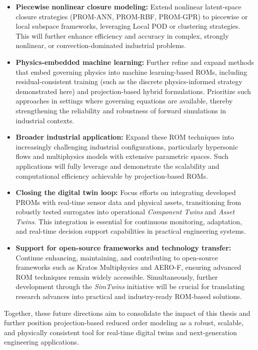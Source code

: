 \begin{itemize}
    \item \textbf{Piecewise nonlinear closure modeling:} Extend nonlinear latent-space closure strategies (PROM-ANN, PROM-RBF, PROM-GPR) to piecewise or local subspace frameworks, leveraging Local POD or clustering strategies. This will further enhance efficiency and accuracy in complex, strongly nonlinear, or convection-dominated industrial problems.
    
    \item \textbf{Physics-embedded machine learning:} Further refine and expand methods that embed governing physics into machine learning-based ROMs, including residual-consistent training (such as the discrete physics-informed strategy demonstrated here) and projection-based hybrid formulations. Prioritize such approaches in settings where governing equations are available, thereby strengthening the reliability and robustness of forward simulations in industrial contexts.
    
    \item \textbf{Broader industrial application:} Expand these ROM techniques into increasingly challenging industrial configurations, particularly hypersonic flows and multiphysics models with extensive parametric spaces. Such applications will fully leverage and demonstrate the scalability and computational efficiency achievable by projection-based ROMs.
    
    \item \textbf{Closing the digital twin loop:} Focus efforts on integrating developed PROMs with real-time sensor data and physical assets, transitioning from robustly tested surrogates into operational \textit{Component Twins} and \textit{Asset Twins}. This integration is essential for continuous monitoring, adaptation, and real-time decision support capabilities in practical engineering systems.
    
    \item \textbf{Support for open-source frameworks and technology transfer:} Continue enhancing, maintaining, and contributing to open-source frameworks such as Kratos Multiphysics and AERO-F, ensuring advanced ROM techniques remain widely accessible. Simultaneously, further development through the \textit{SimTwins} initiative will be crucial for translating research advances into practical and industry-ready ROM-based solutions.
\end{itemize}

Together, these future directions aim to consolidate the impact of this thesis and further position projection-based reduced order modeling as a robust, scalable, and physically consistent tool for real-time digital twins and next-generation engineering applications.
